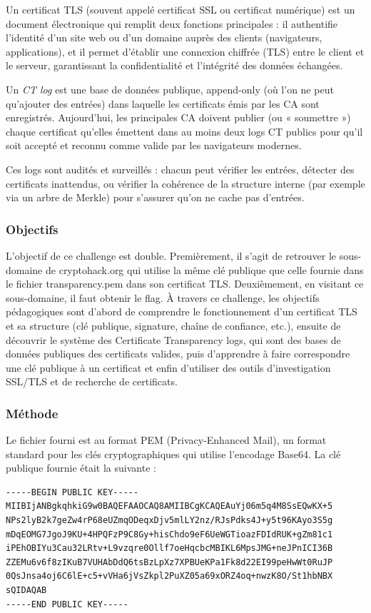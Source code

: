 Un certificat TLS (souvent appelé certificat SSL ou certificat numérique)
est un document électronique qui remplit deux fonctions principales : il authentifie l'identité d'un site web ou d'un domaine auprès des clients (navigateurs, applications), et il permet d'établir une connexion chiffrée (TLS) entre le client et le serveur, garantissant la confidentialité et l'intégrité des données échangées.

Un \emph{CT log} est une base de données publique, append-only (où l'on ne
peut qu'ajouter des entrées) dans laquelle les certificats émis par les CA
sont enregistrés. Aujourd'hui, les principales CA doivent publier (ou
« soumettre ») chaque certificat qu'elles émettent dans au moins deux logs
CT publics pour qu'il soit accepté et reconnu comme valide par les
navigateurs modernes.

Ces logs sont audités et surveillés : chacun peut vérifier les entrées,
détecter des certificats inattendus, ou vérifier la cohérence de la
structure interne (par exemple via un arbre de Merkle) pour s'assurer
qu'on ne cache pas d'entrées.

\subsubsection{Objectifs}
L'objectif de ce challenge est double. Premièrement, il s'agit de retrouver le sous-domaine de cryptohack.org qui utilise la même clé publique que celle fournie dans le fichier transparency.pem dans son certificat TLS. Deuxièmement, en visitant ce sous-domaine, il faut obtenir le flag. À travers ce challenge, les objectifs pédagogiques sont d'abord de comprendre le fonctionnement d’un certificat TLS et sa structure (clé publique, signature, chaîne de confiance, etc.), ensuite de découvrir le système des Certificate Transparency logs, qui sont des bases de données publiques des certificats valides, puis d'apprendre à faire correspondre une clé publique à un certificat et enfin d'utiliser des outils d’investigation SSL/TLS et de recherche de certificats.

\subsubsection{Méthode}
Le fichier fourni est au format PEM (Privacy-Enhanced Mail), un format standard pour les clés cryptographiques qui utilise l'encodage Base64. La clé publique fournie était la suivante :

\begin{verbatim}
-----BEGIN PUBLIC KEY-----
MIIBIjANBgkqhkiG9w0BAQEFAAOCAQ8AMIIBCgKCAQEAuYj06m5q4M8SsEQwKX+5
NPs2lyB2k7geZw4rP68eUZmqODeqxDjv5mlLY2nz/RJsPdks4J+y5t96KAyo3S5g
mDqEOMG7JgoJ9KU+4HPQFzP9C8Gy+hisChdo9eF6UeWGTioazFDIdRUK+gZm81c1
iPEhOBIYu3Cau32LRtv+L9vzqre0Ollf7oeHqcbcMBIKL6MpsJMG+neJPnICI36B
ZZEMu6v6f8zIKuB7VUHAbDdQ6tsBzLpXz7XPBUeKPa1Fk8d22EI99peHwWt0RuJP
0QsJnsa4oj6C6lE+c5+vVHa6jVsZkpl2PuXZ05a69xORZ4oq+nwzK8O/St1hbNBX
sQIDAQAB
-----END PUBLIC KEY-----
\end{verbatim}
